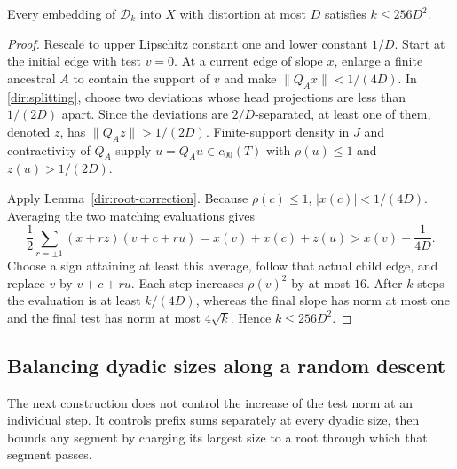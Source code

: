 \begin{proposition}\label{dir:deterministic-descent}
Every embedding of $\mathcal D_k$ into $X$ with distortion at most $D$
satisfies $k\le256D^2$.
\end{proposition}
\begin{proof}
Rescale to upper Lipschitz constant one and lower constant $1/D$.
Start at the initial edge with test $v=0$.  At a current edge of slope
$x$, enlarge a finite ancestral $A$ to contain the support of $v$ and
make $\|Q_Ax\|<1/(4D)$.  In \eqref{dir:splitting}, choose two deviations
whose head projections are less than $1/(2D)$ apart.  Since the
deviations are $2/D$-separated, at least one of them, denoted $z$, has
$\|Q_Az\|>1/(2D)$.  Finite-support density in $J$ and contractivity of
$Q_A$ supply $u=Q_Au\in c_{00}(T)$ with
$\rho(u)\le1$ and $z(u)>1/(2D)$.

Apply Lemma~\ref{dir:root-correction}.  Because $\rho(c)\le1$,
$|x(c)|<1/(4D)$.  Averaging the two matching evaluations gives
\[
 \frac12\sum_{r=\pm1}(x+rz)(v+c+ru)
 =x(v)+x(c)+z(u)>x(v)+\frac1{4D}.
\]
Choose a sign attaining at least this average, follow that actual child
edge, and replace $v$ by $v+c+ru$.  Each step increases $\rho(v)^2$ by
at most $16$.  After $k$ steps the evaluation is at least $k/(4D)$,
whereas the final slope has norm at most one and the final test has
norm at most $4\sqrt{k}$.  Hence $k\le256D^2$.
\end{proof}

\subsection{Balancing dyadic sizes along a random descent}
The next construction does not control the increase of the test norm
at an individual step.  It controls prefix sums separately at every
dyadic size, then bounds any segment by charging its largest size to a
root through which that segment passes.

